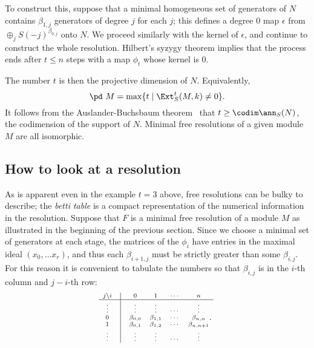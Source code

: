 To construct this, suppose that a minimal homogeneous set of generators of $N$
contains $\beta_{1,j}$ generators of degree $j$ for each $j$; this defines a degree 0 map $\epsilon$
from 
$
\oplus_jS(-j)^{\beta_{0,j}}
$
onto $N$. We proceed similarly with the kernel of $\epsilon$, and continue to construct the whole resolution.
Hilbert's syzygy theorem \cite[Corollary 19.7]{Eisenbud1995} implies that the process ends after $t\leq n$ steps with a map $\phi_t$ whose
kernel is 0. 

The number $t$ is then the projective dimension of $N$. 
Equivalently, 
$$
\pd\ M = \max\{t \mid \Ext_S^t(M,k) \neq 0 \}.
$$
It follows from the Auslander-Buchsbaum
theorem~\cite[Theorem 19.9]{Eisenbud1995} that $t \geq \codim \ann_S(N)$, the codimension of the support of $N$.
Minimal free resolutions of a given module $M$ are all isomorphic.


\subsection{How to look at a resolution}
As is apparent even in the example $t=3$ above, free resolutions can be bulky to describe; the 
\emph{betti table} is a compact representation of the numerical information in the resolution.
Suppose that 
$F$ is a minimal free resolution of a module $M$ as illustrated in the beginning of the previous section. Since we choose a minimal set of generators at each stage, the matrices of the $\phi_i$ have entries in the maximal
ideal $(x_0,\dots x_r)$, and thus each $\beta_{i+1, j}$ must be strictly greater than some $\beta_{i,j}$. For this reason it
is convenient to tabulate the numbers so that $\beta_{i,j}$ is in the $i$-th column and $j-i$-th row:
$$
\scriptsize{
\begin{matrix} 
j\backslash i&\vline&0   &  1    & \cdots & n    \cr\hline
\vdots&\vline&\vdots&\vdots & \cdots    &\vdots     \cr 
       0&\vline&\beta_{0,0}&\beta_{1,1}&\cdots&\beta_{n,n}\cr
       1&\vline&\beta_{0,1}&\beta_{1,2}&\cdots&\beta_{n,n+1}\cr
\vdots&\vline&\vdots&\vdots & \cdots    &\vdots     \cr 
\end{matrix}.
}
$$         


